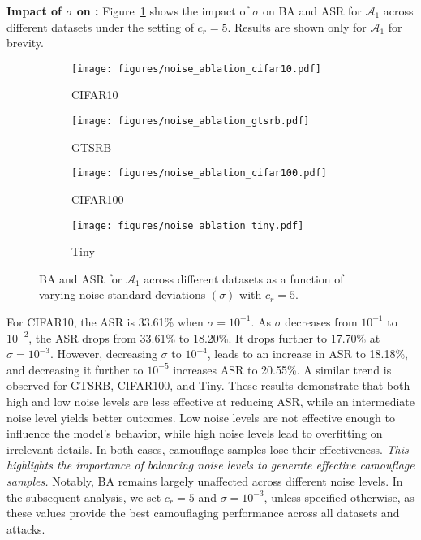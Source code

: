 \vspace{0.15cm}
\noindent \textbf{Impact of $\sigma$ on \methodname:} Figure~\ref{fig:noise_ablation} shows the impact of $\sigma$ on BA and ASR for $\mathcal{A}_1$ across different datasets under the setting of $c_{r}=5$. Results are shown only for $\mathcal{A}_1$ for brevity.
\begin{figure}[!t]
    \centering
    \begin{subfigure}{0.48\linewidth}
        \centering
        \texttt{[image: figures/noise\_ablation\_cifar10.pdf]}
        \caption{CIFAR10}
    \end{subfigure}\hspace{0.1cm}
    \begin{subfigure}{0.48\linewidth}
        \centering
        \texttt{[image: figures/noise\_ablation\_gtsrb.pdf]}
        \caption{GTSRB}
    \end{subfigure}
    \begin{subfigure}{0.48\linewidth}
        \centering
        \texttt{[image: figures/noise\_ablation\_cifar100.pdf]}
        \caption{CIFAR100}
    \end{subfigure}\hspace{0.1cm}
    \begin{subfigure}{0.48\linewidth}
        \centering
        \texttt{[image: figures/noise\_ablation\_tiny.pdf]}
        \caption{Tiny}
    \end{subfigure}
    \caption{BA and ASR for $\mathcal{A}_1$ across different datasets as a function of varying noise standard deviations $(\sigma)$ with $c_{r} = 5$.}
    \label{fig:noise_ablation}
\end{figure}
For CIFAR10, the ASR is 33.61\% when $\sigma = 10^{-1}$. As $\sigma$ decreases from $10^{-1}$ to $10^{-2}$, the ASR drops from 33.61\% to 18.20\%. It drops further to 17.70\% at $\sigma = 10^{-3}$. However, decreasing $\sigma$ to $10^{-4}$, leads to an increase in ASR to 18.18\%, and decreasing it further to $10^{-5}$ increases ASR to 20.55\%. A similar trend is observed for GTSRB, CIFAR100, and Tiny. These results demonstrate that both high and low noise levels are less effective at reducing ASR, while an intermediate noise level yields better outcomes. Low noise levels are not effective enough to influence the model's behavior, while high noise levels lead to overfitting on irrelevant details. In both cases, camouflage samples lose their effectiveness. \textit{This highlights the importance of balancing noise levels to generate effective camouflage samples.} Notably, BA remains largely unaffected across different noise levels. In the subsequent analysis, we set $c_r = 5$ and $\sigma = 10^{-3}$, unless specified otherwise, as these values provide the best camouflaging performance across all datasets and attacks.

